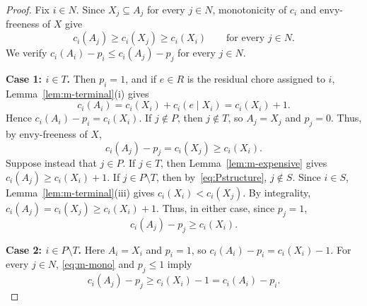 \documentclass[sigconf,anonymous]{aamas}
\newcommand{\agents}{N}
\newcommand{\subsidy}{p}
\newcommand{\cost}{c}
\theoremstyle{acmplain}
\theoremstyle{acmdefinition}
\theoremstyle{acmplain}
\begin{document}
\begin{proof}
Fix $i\in\agents$. Since $X_j\subseteq A_j$ for every $j\in\agents$, monotonicity of $\cost_i$ and envy-freeness of $X$ give
\begin{equation}
\label{eq:m-mono}
    \cost_i(A_j)
    \geq \cost_i(X_j)
    \geq \cost_i(X_i)
    \qquad\text{for every }j\in\agents.
\end{equation}
We verify
\(\cost_i(A_i)-\subsidy_i \leq \cost_i(A_j)-\subsidy_j \) for every $j\in\agents$.

\smallskip
\noindent\textbf{Case 1: $i\in T$.}
Then $\subsidy_i=1$, and if $e\in R$ is the residual chore assigned to $i$, Lemma~\ref{lem:m-terminal}(i) gives
\[
    \cost_i(A_i)
    =\cost_i(X_i)+\cost_i(e\mid X_i)
    =\cost_i(X_i)+1.
\]
Hence $\cost_i(A_i)-\subsidy_i=\cost_i(X_i)$. If $j\notin P$, then $j\notin T$, so $A_j=X_j$ and $\subsidy_j=0$. Thus, by envy-freeness of $X$,
\[
    \cost_i(A_j)-\subsidy_j
    =\cost_i(X_j)
    \geq \cost_i(X_i).
\] Suppose instead that $j\in P$. If $j\in T$, then Lemma~\ref{lem:m-expensive} gives \( \cost_i(A_j)\geq \cost_i(X_i)+1. \) If $j\in P\setminus T$, then by~\eqref{eq:Pstructure}, $j\notin S$. Since $i\in S$, Lemma~\ref{lem:m-terminal}(iii) gives \(\cost_i(X_i)<\cost_i(X_j).\) By integrality, \(  \cost_i(A_j)=\cost_i(X_j)\geq \cost_i(X_i)+1. \) Thus, in either case, since $\subsidy_j=1$,
\[
    \cost_i(A_j)-\subsidy_j\geq \cost_i(X_i).
\]

\smallskip
\noindent\textbf{Case 2: $i\in P\setminus T$.} Here $A_i=X_i$ and $\subsidy_i=1$, so \(\cost_i(A_i)-\subsidy_i=\cost_i(X_i)-1. \) For every $j\in\agents$, \eqref{eq:m-mono} and $\subsidy_j\leq 1$ imply
\[
    \cost_i(A_j)-\subsidy_j
    \geq \cost_i(X_i)-1
    =\cost_i(A_i)-\subsidy_i.
\]


\end{proof}
\end{document}
